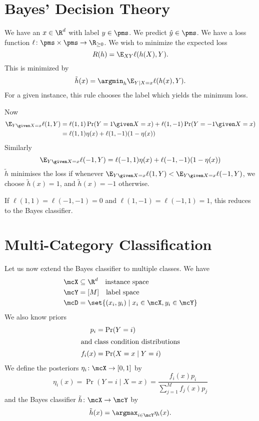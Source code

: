 \section{Bayes' Decision Theory} \label{sec:bayes_decision}
We have an $x \in \R^d$ with label $y \in \pms$.
We predict $\hat{y} \in \pms$.
We have a loss function $\ell\colon \pms \times \pms \to \R_{\ge 0}$.
We wish to minimize the expected loss \[
    R(h) = \E_{XY} \ell(h(X), Y).
\] This is minimized by \[
    \tilde{h}(x) = \argmin_h \E_{Y \mid X = x} \ell(h(x), Y).
\] For a given instance, this rule chooses the label which yields the
minimum loss.

Now \begin{align*}
    \E_{Y \given X = x} \ell(1, Y)
        &= \ell(1, 1) \Pr(Y = 1 \given X = x)
            + \ell(1, -1) \Pr(Y = -1 \given X = x) \\
        &= \ell(1, 1) \eta(x) + \ell(1, -1) (1 - \eta(x))
\end{align*}
Similarly \[
    \E_{Y \given X = x} \ell(-1, Y)
        = \ell(-1, 1) \eta(x) + \ell(-1, -1) (1 - \eta(x))
\] $\tilde h$ minimises the loss if whenever
$\E_{Y \given X = x} \ell(1, Y) < \E_{Y \given X = x} \ell(-1, Y)$,
we choose $\tilde{h}(x) = 1$, and $\tilde{h}(x) = -1$ otherwise.

If $\ell(1, 1) = \ell(-1, -1) = 0$ and $\ell(1, -1) = \ell(-1, 1) = 1$, this
reduces to the Bayes classifier.

\section{Multi-Category Classification} \label{sec:bayes:multi}
Let us now extend the Bayes classifier to multiple classes.
We have \begin{align*}
    \mcX &\subseteq \R^d \quad \text{instance space} \\
    \mcY &= [M] \quad \text{label space} \\
    \mcD &= \set{(x_i, y_i) \mid x_i \in \mcX, y_i \in \mcY}
\end{align*}
We also know priors \begin{align*}
    p_i &= \Pr(Y = i) \\
    \intertext{and class condition distributions}
    f_i(x) &= \Pr(X = x \mid Y = i)
\end{align*}
We define the posteriors $\eta_i\colon \mcX \to [0, 1]$ by \[
    \eta_i(x) = \Pr(Y = i \mid X = x)
        = \frac{f_i(x) p_i}{\sum_{j = 1}^M f_j(x) p_j}
\] and the Bayes classifier $\tilde{h}\colon \mcX \to \mcY$ by \[
    \tilde{h}(x) = \argmax_{i \in \mcY} \eta_i(x).
\]
